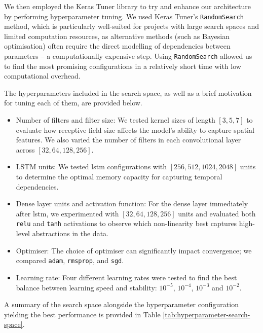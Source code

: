 We then employed the Keras Tuner library to try and enhance our architecture by performing hyperparameter tuning. We used Keras Tuner's \texttt{RandomSearch} method, which is particularly well-suited for projects with large search spaces and limited computation resources, as alternative methods (such as Bayesian optimisation) often require the direct modelling of dependencies between parameters -- a computationally expensive step. Using \texttt{RandomSearch} allowed us to find the most promising configurations in a relatively short time with low computational overhead.

The hyperparameters included in the search space, as well as a brief motivation for tuning each of them, are provided below. 

\begin{itemize} 
\item Number of filters and filter size: We tested kernel sizes of length $[3, 5, 7]$ to evaluate how receptive field size affects the model's ability to capture spatial features. We also varied the number of filters in each convolutional layer across $[32, 64, 128, 256]$.
\item LSTM units: We tested \acrshort{lstm} configurations with 
$[256, 512, 1024, 2048]$ units to determine the optimal memory capacity for capturing temporal dependencies. 
\item Dense layer units and activation function: For the dense layer immediately after \acrshort{lstm}, we experimented with $[32, 64, 128, 256]$ units and evaluated both \texttt{relu} and \texttt{tanh} activations to observe which non-linearity best captures high-level abstractions in the data. 
\item Optimiser: The choice of optimiser can significantly impact convergence; we compared \texttt{adam}, \texttt{rmsprop}, and \texttt{sgd}. 
\item Learning rate: Four different learning rates were tested to find the best balance between learning speed and stability: $10^{-5}$, $10^{-4}$, $10^{-3}$ and $10^{-2}$.
\end{itemize}
A summary of the search space alongside the hyperparameter configuration yielding the best performance is provided in Table \ref{tab:hyperparameter-search-space}.

